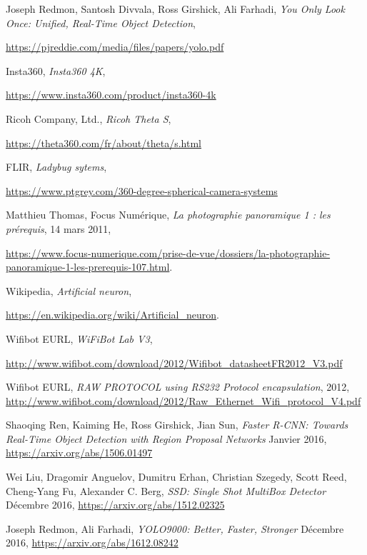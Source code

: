 \begin{thebibliography}{9}
		Joseph Redmon, Santosh Divvala, Ross Girshick, Ali Farhadi,
		\emph{You Only Look Once: Unified, Real-Time Object Detection},
		\par
		\url{https://pjreddie.com/media/files/papers/yolo.pdf}
	
		Insta360,
		\emph{Insta360 4K},
		\par
		\url{https://www.insta360.com/product/insta360-4k}
	
		Ricoh Company, Ltd.,
		\emph{Ricoh Theta S},
		\par
		\url{https://theta360.com/fr/about/theta/s.html}
	
		FLIR,
		\emph{Ladybug sytems},
		\par
		\url{https://www.ptgrey.com/360-degree-spherical-camera-systems}
		
		Matthieu Thomas,
		Focus Numérique,
		\emph{La photographie panoramique 1 : les prérequis},
		14 mars 2011,
		\par
		\url{https://www.focus-numerique.com/prise-de-vue/dossiers/la-photographie-panoramique-1-les-prerequis-107.html}.

		Wikipedia,
		\emph{Artificial neuron},
		\par
		\url{https://en.wikipedia.org/wiki/Artificial_neuron}.

		Wifibot EURL,
		\emph{WiFiBot Lab V3},
		\par
		\url{http://www.wifibot.com/download/2012/Wifibot_datasheetFR2012_V3.pdf}
	
		Wifibot EURL,
		\emph{RAW PROTOCOL using RS232 Protocol encapsulation},
		2012,
		\url{http://www.wifibot.com/download/2012/Raw_Ethernet_Wifi_protocol_V4.pdf}
		
		Shaoqing Ren, Kaiming He, Ross Girshick, Jian Sun,
		\emph{Faster R-CNN: Towards Real-Time Object Detection with Region Proposal Networks}
		Janvier 2016,
		\url{https://arxiv.org/abs/1506.01497}

		Wei Liu, Dragomir Anguelov, Dumitru Erhan, Christian Szegedy, Scott Reed, Cheng-Yang Fu, Alexander C. Berg,
		\emph{SSD: Single Shot MultiBox Detector}
		Décembre 2016,
		\url{https://arxiv.org/abs/1512.02325}
	
		Joseph Redmon, Ali Farhadi,
		\emph{YOLO9000: Better, Faster, Stronger}
		Décembre 2016,
		\url{https://arxiv.org/abs/1612.08242}
	

\end{thebibliography}

